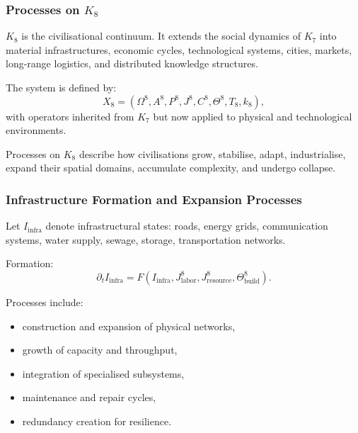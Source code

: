 

\subsubsection{Processes on \texorpdfstring{$K_8$}{K_8}}
\label{sec:processes-k8}

$K_8$ is the civilisational continuum.  
It extends the social dynamics of $K_7$ into material infrastructures, 
economic cycles, technological systems, cities, markets, 
long-range logistics, and distributed knowledge structures.

The system is defined by:
\[
X_8 = (\Omega^8, A^8, P^8, J^8, C^8, \Theta^8, T_8, k_8),
\]
with operators inherited from $K_7$ but now applied to physical and 
technological environments.

Processes on $K_8$ describe how civilisations grow, stabilise, adapt, 
industrialise, expand their spatial domains, accumulate complexity, 
and undergo collapse.

\subsubsection{Infrastructure Formation and Expansion Processes}

Let $I_{\text{infra}}$ denote infrastructural states: roads, energy grids, 
communication systems, water supply, sewage, storage, transportation networks.

Formation:
\[
\partial_t I_{\text{infra}} = 
F(I_{\text{infra}}, J^8_{\text{labor}}, J^8_{\text{resource}}, \Theta^8_{\text{build}}).
\]

Processes include:
\begin{itemize}
    \item construction and expansion of physical networks,
    \item growth of capacity and throughput,
    \item integration of specialised subsystems,
    \item maintenance and repair cycles,
    \item redundancy creation for resilience.
\end{itemize}

